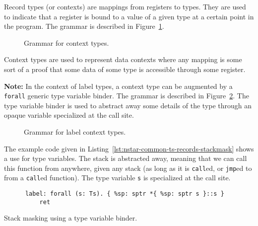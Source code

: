 Record types (or contexts) are mappings from registers to types.
They are used to indicate that a register is bound to a value of a given type at a certain point in the program.
The grammar is described in Figure~\ref{fig:nstar-common-ts-records-syntax}.

\begin{figure}[htb]
  \centering
  \caption{Grammar for context types.}
  \label{fig:nstar-common-ts-records-syntax}
\end{figure}

Context types are used to represent data contexts where any mapping is some sort of a proof that some data of some type is accessible through some register.

\vspace{\baselineskip}

\textbf{Note:} In the context of label types, a context type can be augmented by a \texttt{forall} generic type variable binder.
The grammar is described in Figure~\ref{fig:nstar-common-ts-label-types-syntax}.
The type variable binder is used to abstract away some details of the type through an opaque variable specialized at the call site.

\begin{figure}[htb]
  \centering
  \caption{Grammar for label context types.}
  \label{fig:nstar-common-ts-label-types-syntax}
\end{figure}

The example code given in Listing~\ref{lst:nstar-common-ts-records-stackmask} shows a use for type variables.
The stack is abstracted away, meaning that we can call this function from anywhere, given any stack (as long as it is \texttt{call}ed, or \texttt{jmp}ed to from a \texttt{call}ed function).
The type variable \texttt{s} is specialized at the call site.

\begin{listing}[htb]
  \centering
  \begin{minipage}{0.90\textwidth}
    \begin{verbatim}
      label: forall (s: Ts). { %sp: sptr *{ %sp: sptr s }::s }
          ret
    \end{verbatim}
  \end{minipage}
  \caption{Stack masking using a type variable binder.}
  \label{lst:nstar-common-ts-records-stackmask}
\end{listing}

